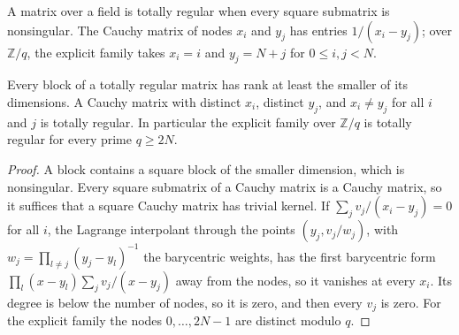 \begin{definition}
  \label{def:lowerbounds-algebraic-totally-regular}
  \leanok
  A matrix over a field is totally regular when every square submatrix is
  nonsingular. The Cauchy matrix of nodes $x_i$ and $y_j$ has entries
  $1/(x_i-y_j)$; over $\mathbb{Z}/q$, the explicit family takes $x_i=i$ and
  $y_j=N+j$ for $0\le i,j<N$.
\end{definition}

\begin{lemma}
  \label{lem:lowerbounds-algebraic-cauchy}
  \leanok
  Every block of a totally regular matrix has rank at least the smaller of
  its dimensions. A Cauchy matrix with distinct $x_i$, distinct $y_j$, and
  $x_i\ne y_j$ for all $i$ and $j$ is totally regular. In particular the
  explicit family over $\mathbb{Z}/q$ is totally regular for every prime
  $q\ge2N$.
\end{lemma}
\begin{proof}
  \leanok
  A block contains a square block of the smaller dimension, which is
  nonsingular. Every square submatrix of a Cauchy matrix is a Cauchy
  matrix, so it suffices that a square Cauchy matrix has trivial kernel.
  If $\sum_j v_j/(x_i-y_j)=0$ for all $i$, the Lagrange interpolant through
  the points $(y_j, v_j/w_j)$, with $w_j=\prod_{l\ne j}(y_j-y_l)^{-1}$ the
  barycentric weights, has the first barycentric form
  $\prod_l(x-y_l)\sum_j v_j/(x-y_j)$ away from the nodes, so it vanishes at
  every $x_i$. Its degree is below the number of nodes, so it is zero, and
  then every $v_j$ is zero. For the explicit family the nodes $0,\dots,2N-1$
  are distinct modulo $q$.
\end{proof}

